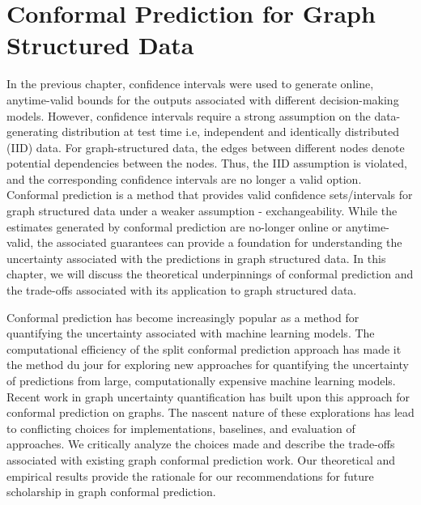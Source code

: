 \chapter{Conformal Prediction for Graph Structured Data}
\label{chp:graphConformal}
In the previous chapter, confidence intervals were used to generate online, anytime-valid bounds for the outputs associated with different decision-making models.
However, confidence intervals require a strong assumption on the data-generating distribution at test time i.e, independent and identically distributed (IID) data.
For graph-structured data, the edges between different nodes denote potential dependencies between the nodes.
Thus, the IID assumption is violated, and the corresponding confidence intervals are no longer a valid option.
Conformal prediction is a method that provides valid confidence sets/intervals for graph structured data under a weaker assumption - exchangeability.
While the estimates generated by conformal prediction are no-longer online or anytime-valid, the associated guarantees can provide a foundation for understanding the uncertainty associated with the predictions in graph structured data.
In this chapter, we will discuss the theoretical underpinnings of conformal prediction and the trade-offs associated with its application to graph structured data.


Conformal prediction has become increasingly popular as a method for quantifying the uncertainty associated with machine learning models. 
The computational efficiency of the split conformal prediction approach has made it the method du jour for exploring new approaches for quantifying the uncertainty of predictions from large, computationally expensive machine learning models.
Recent work in graph uncertainty quantification has built upon this approach for conformal prediction on graphs.
The nascent nature of these explorations has lead to conflicting choices for implementations, baselines, and evaluation of approaches.
We critically analyze the choices made and describe the trade-offs associated with existing graph conformal prediction work. 
Our theoretical and empirical results provide the rationale for our recommendations for future scholarship in graph conformal prediction.

